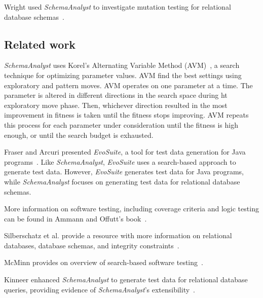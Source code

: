 Wright used \textit{SchemaAnalyst} to investigate mutation testing for relational database
schemas~\cite{wright2015mutation}.

\subsection{Related work}
\textit{SchemaAnalyst} uses Korel's Alternating Variable Method (AVM)~\cite{Korel:AVM},
a search technique for optimizing parameter values. AVM find the best settings using 
exploratory and pattern moves. AVM operates on one parameter at a time. The parameter is
altered in different directions in the search space during ht exploratory move phase.  Then,
whichever direction resulted in the most improvement in fitness is taken until the fitness stops 
improving. AVM repeats this process for each parameter under consideration until the fitness is
high enough, or until the search budget is exhausted.

Fraser and Arcuri presented \textit{EvoSuite}, a tool for test data generation for
Java programs~\cite{Fraser2011evosuite}.
Like \textit{SchemaAnalyst}, \textit{EvoSuite} uses a search-based approach 
to generate test data. However, \textit{EvoSuite} generates test data for Java programs, while
\textit{SchemaAnalyst} focuses on generating test data for relational database schemas.

More information on software testing, including coverage criteria and logic testing
can be found in Ammann and Offutt's book~\cite{ammann2008}.

Silberschatz et al. provide a resource with more information on relational databases,
database schemas, and integrity constraints~\cite{databasebook}.

McMinn provides on overview of search-based software testing~\cite{STVR:STVR294}.

Kinneer enhanced \textit{SchemaAnalyst} to generate test data for relational database
queries, providing evidence of \textit{SchemaAnalyst}'s extensibility~\cite{kinneer2016comp}.
